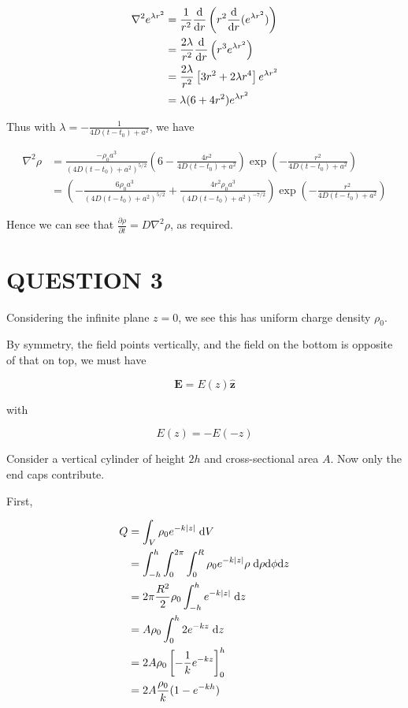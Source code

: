 \documentclass[a4paper]{article}
\begin{document}
\begin{align*}
\nabla^{2} e^{\lambda r^{2}} & = \frac{1}{r^{2} }\frac{\mathrm{d} }{\mathrm{d} r} \left(  r^{2} \frac{\mathrm{d} }{\mathrm{d} r}( e^{\lambda r^{2}} ) \right) \\
& = \frac{2 \lambda}{r^{2}} \frac{\mathrm{d} }{\mathrm{d} r} \left(  r^{3} e^{\lambda r^{2}} \right) \\
& =  \frac{2 \lambda}{r^{2}} \left[   3r^{2} + 2 \lambda r^{4} \right] e^{\lambda r^{2}} \\
& = \lambda(6 + 4r^{2}) e^{\lambda r^{2}}
\end{align*}

Thus with $ \lambda = - \frac{1}{4D(t - t_{0}) + a^{2}}  $, we have 

\begin{align*}
\nabla^{2} \rho  & = \frac{- \rho_{0}a^{3}}{	(4D(t - t_{0}) + a^{2})^{5/2}} \left(  6 - \frac{4 r^{2}}{4D(t - t_{0}) + a^{2}}  \right) \exp \left( - \frac{r^{2}}{4D(t - t_{0}) + a^{2}} \right)  \\
& = \left( -  \frac{6 \rho_{0}a^{3}}{	(4D(t - t_{0}) + a^{2})^{5/2}} + \frac{4 r^{2} \rho_{0}a^{3} }{(4D(t - t_{0}) + a^{2})^{-7/2}} \right) \exp \left( - \frac{r^{2}}{4D(t - t_{0}) + a^{2}} \right)
\end{align*}

Hence we can see that $ \frac{\partial \rho }{\partial t} = D \nabla^{2} \rho  $, as required.



\section{QUESTION 3}

Considering the infinite plane $ z = 0 $, we see this has uniform charge density $ \rho_{0} $. 

By symmetry, the field points vertically, and the field on the bottom is opposite of that on top, we must have

\[ \mathbf{E} = E(z) \hat{\mathbf{z}} \]

with

\[ E(z) = -E(-z) \]

Consider a vertical cylinder of height $ 2h $ and cross-sectional area $ A $. Now only the end caps contribute.

First, 

\begin{align*}
Q & = \int_{V} \rho_{0} e^{-k| z |}  \; \mathrm{d} V \\
& = \int_{-h}^{h} \int_{0}^{2\pi}  \int_{0}^{R} \rho_{0} e^{-k| z |}  \rho \; \mathrm{d} \rho \mathrm{d} \phi \mathrm{d} z \\
& = 2 \pi \frac{R^{2}}{2} \rho_{0} \int_{-h}^{h}  e^{-k| z |}  \;  \mathrm{d} z \\
& =  A \rho_{0} \int_{0}^{h} 2 e^{-kz}   \;  \mathrm{d} z \\
& =  2 A \rho_{0} \left[ - \frac{1}{k} e^{-kz} \right]_{0}^{h} \\
& =  2 A \frac{\rho_{0}}{k} (1 - e^{-kh}) 
\end{align*}
\end{document}
